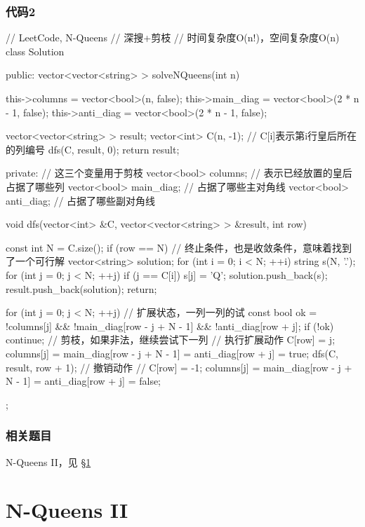 \subsubsection{代码2}
\begin{Code}
// LeetCode, N-Queens
// 深搜+剪枝
// 时间复杂度O(n!)，空间复杂度O(n)
class Solution {
public:
    vector<vector<string> > solveNQueens(int n) {
        this->columns = vector<bool>(n, false);
        this->main_diag = vector<bool>(2 * n - 1, false);
        this->anti_diag = vector<bool>(2 * n - 1, false);

        vector<vector<string> > result;
        vector<int> C(n, -1);  // C[i]表示第i行皇后所在的列编号
        dfs(C, result, 0);
        return result;
    }
private:
    // 这三个变量用于剪枝
    vector<bool> columns;  // 表示已经放置的皇后占据了哪些列
    vector<bool> main_diag;  // 占据了哪些主对角线
    vector<bool> anti_diag;  // 占据了哪些副对角线

    void dfs(vector<int> &C, vector<vector<string> > &result, int row) {
        const int N = C.size();
        if (row == N) { // 终止条件，也是收敛条件，意味着找到了一个可行解
            vector<string> solution;
            for (int i = 0; i < N; ++i) {
                string s(N, '.');
                for (int j = 0; j < N; ++j) {
                    if (j == C[i]) s[j] = 'Q';
                }
                solution.push_back(s);
            }
            result.push_back(solution);
            return;
        }

        for (int j = 0; j < N; ++j) {  // 扩展状态，一列一列的试
            const bool ok = !columns[j] && !main_diag[row - j + N - 1]  &&
                    !anti_diag[row + j];
            if (!ok) continue;  // 剪枝，如果非法，继续尝试下一列
            // 执行扩展动作
            C[row] = j;
            columns[j] = main_diag[row - j + N - 1] = anti_diag[row + j] = true;
            dfs(C, result, row + 1);
            // 撤销动作
            // C[row] = -1;
            columns[j] = main_diag[row - j + N - 1] = anti_diag[row + j] = false;
        }
    }
};
\end{Code}


\subsubsection{相关题目}
\begindot
\item N-Queens II，见 \S \ref{sec:n-queens-ii}
\myenddot


\section{N-Queens II} %
\label{sec:n-queens-ii}


